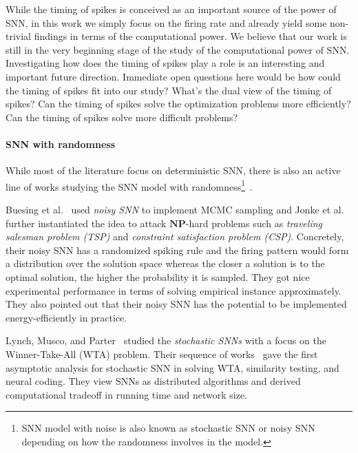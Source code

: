 \documentclass[11pt]{article}
\theoremstyle{remark}
\theoremstyle{definition}
\newcommand{\class}[1]{\mathbf{#1}}
\newcommand{\NP}{\class{NP}}
\begin{document}
While the timing of spikes is conceived as an important source of the power of SNN, in this work we simply focus on the firing rate and already yield some non-trivial findings in terms of the computational power.
We believe that our work is still in the very beginning stage of the study of the computational power of SNN.
Investigating how does the timing of spikes play a role is an interesting and important future direction. Immediate open questions here would be how could the timing of spikes fit into our study? What's the dual view of the timing of spikes? Can the timing of spikes solve the optimization problems more efficiently? Can the timing of spikes solve more difficult problems?

\paragraph{SNN with randomness}
While most of the literature focus on deterministic SNN, there is also an active line of works studying the SNN model with randomness\footnote{SNN model with noise is also known as stochastic SNN or noisy SNN depending on how the randomness involves in the model.}~\cite{allen1994evaluation,shadlen1994noise,faisal2008noise,buesing2011neural,jonke2014theoretical,maass2015spike,jonke2016solving,LMP17BDA,LMP17ITCS,LMP17DISC,LM18}.

Buesing et al.~\cite{buesing2011neural} used \textit{noisy SNN} to implement MCMC sampling and Jonke et al.~\cite{jonke2014theoretical,maass2015spike,jonke2016solving} further instantiated the idea to attack $\NP$-hard problems such as \textit{traveling salesman problem (TSP)} and \textit{constraint satisfaction problem (CSP)}. Concretely, their noisy SNN has a randomized spiking rule and the firing pattern would form a distribution over the solution space whereas the closer a solution is to the optimal solution, the higher the probability it is sampled. They got nice experimental performance in terms of solving empirical instance approximately. They also pointed out that their noisy SNN has the potential to be implemented energy-efficiently in practice.

Lynch, Musco, and Parter~\cite{LMP17ITCS} studied the \textit{stochastic SNNs} with a focus on the Winner-Take-All (WTA) problem. Their sequence of works~\cite{LMP17BDA,LMP17ITCS,LMP17DISC,LM18} gave the first asymptotic analysis for stochastic SNN in solving WTA, similarity testing, and neural coding. They view SNNs as distributed algorithms and derived computational tradeoff in running time and network size.
\end{document}
